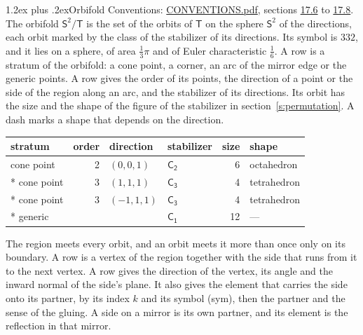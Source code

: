 \documentclass[10pt,a4paper]{article}
\makeatletter
\renewcommand\section{\@startsection{section}{1}{\z@}{-3ex plus -1ex minus -.2ex}%
  {1.2ex plus .2ex}{\normalfont\large\sffamily\bfseries\color{parttitle}}}
\numberwithin{equation}{section}
\newcommand{\grp}[1]{\mathsf{#1}}
\newcommand{\orbname}[1]{#1}
\newcommand{\dirvec}[3]{(#1, #2, #3)}
\newcommand{\twosphere}{\mathsf{S}^{2}}
\makeatother
\begin{document}
\section{Orbifold}\label{s:orbifold}
Conventions: \href{../../CONVENTIONS.pdf}{CONVENTIONS.pdf}, sections \href{../../CONVENTIONS.pdf\#conv.17.6}{17.6} to \href{../../CONVENTIONS.pdf\#conv.17.8}{17.8}.
The orbifold $\twosphere/\grp{T}$ is the set of the orbits of $\grp{T}$ on the sphere $\twosphere$ of the directions, each orbit marked by the class of the stabilizer of its directions. Its symbol is $\orbname{332}$, and it lies on a sphere, of area $\tfrac{1}{3}\pi$ and of Euler characteristic $\tfrac{1}{6}$.
\leavevmode\label{n:head.stratum}\label{n:head.order.point}\label{n:head.direction}\label{n:head.stabilizer}\label{n:head.size.orbit}\label{n:head.shape}A row is a stratum of the orbifold: a cone point, a corner, an arc of the mirror edge or the generic points. A row gives the order of its points, the direction of a point or the side of the region along an arc, and the stabilizer of its directions. Its orbit has the size and the shape of the figure of the stabilizer in section~\ref{s:permutation}. A dash marks a shape that depends on the direction.
{\small\setlength{\tabcolsep}{4pt}\begin{longtable}{@{}lrllrl@{}}\toprule
stratum & order & direction & stabilizer & size & shape\\\midrule\endhead
\bottomrule\endfoot\endlastfoot
cone point & 2 & $\dirvec{0}{0}{1}$ & \href{C2.pdf}{$\grp{C_{2}}$} & 6 & octahedron\\*
cone point & 3 & $\dirvec{1}{1}{1}$ & \href{C3.pdf}{$\grp{C_{3}}$} & 4 & tetrahedron\\*
cone point & 3 & $\dirvec{-1}{1}{1}$ & \href{C3.pdf}{$\grp{C_{3}}$} & 4 & tetrahedron\\*
generic &  &  & \href{C1.pdf}{$\grp{C_{1}}$} & 12 & ---\\
\bottomrule\end{longtable}}
\leavevmode\label{n:head.vertex.region}\label{n:head.angle}\label{n:head.normal.side}\label{n:head.partner}\label{n:head.sense}The region meets every orbit, and an orbit meets it more than once only on its boundary. A row is a vertex of the region together with the side that runs from it to the next vertex. A row gives the direction of the vertex, its angle and the inward normal of the side's plane. It also gives the element that carries the side onto its partner, by its index $k$ and its symbol (sym), then the partner and the sense of the gluing. A side on a mirror is its own partner, and its element is the reflection in that mirror.
\end{document}
